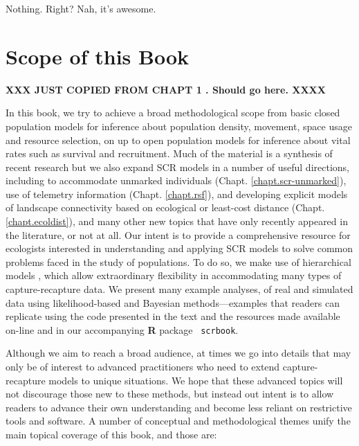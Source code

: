 Nothing. Right?
Nah, it's awesome. 



\section{Scope of this Book}

{\bf XXX JUST COPIED FROM CHAPT 1 . Should go here. XXXX}


In this book, we try to achieve a broad methodological scope from
basic closed population models %
for inference about population density, movement, space usage and resource
selection, on up to open population models for inference about vital
rates such as survival and recruitment. %
Much of the material is a synthesis of recent research but we also
expand SCR models in a number of useful directions, including to
accommodate unmarked individuals (Chapt. \ref{chapt.scr-unmarked}),
use of telemetry information (Chapt. \ref{chapt.rsf}), and developing
explicit models of landscape connectivity based on ecological or
least-cost distance (Chapt. \ref{chapt.ecoldist}), and many other new
topics that have only recently appeared in the literature, or not at all.  Our intent
is to provide a comprehensive resource for ecologists interested in
understanding and applying SCR models to solve common problems faced
in the study of populations.  To do so, we make use of hierarchical
models \citep{royle_dorazio:2008}, which allow extraordinary
flexibility in accommodating many types of capture-recapture data. We
present many example analyses, of real and simulated data using
likelihood-based and Bayesian methods---examples that readers can
replicate using the code presented in the text and the resources made
available on-line and in our accompanying {\bf R} package {\tt
  scrbook}.

Although we aim to reach a broad audience, at times we go into details
that may only be of interest to advanced practitioners who need to
extend capture-recapture models to unique situations.  We hope that
these advanced topics will not discourage those new to these methods,
but instead out intent is to allow readers to advance their own
understanding and become less reliant on restrictive tools and
software.
A number of conceptual and methodological
themes unify the main topical coverage of this book, and those are:


